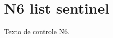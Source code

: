\documentclass{abntexto-ufc}
\begin{document}
\pretextual

\imprimirlistadetabelas

\textual
\section{N6 list sentinel}
Texto de controle N6.
\end{document}
